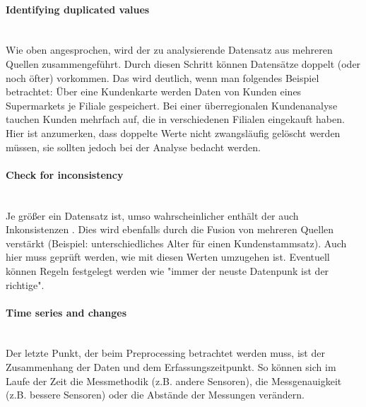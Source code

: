 \paragraph{Identifying duplicated values}\mbox{} \\
Wie oben angesprochen, wird der zu analysierende Datensatz aus mehreren Quellen zusammengeführt. Durch diesen Schritt können Datensätze doppelt (oder noch öfter) vorkommen. Das wird deutlich, wenn man folgendes Beispiel betrachtet: \newline
Über eine Kundenkarte werden Daten von Kunden eines Supermarkets je Filiale gespeichert. Bei einer überregionalen Kundenanalyse tauchen Kunden mehrfach auf, die in verschiedenen Filialen eingekauft haben. Hier ist anzumerken, dass doppelte Werte nicht zwangsläufig gelöscht werden müssen, sie sollten jedoch bei der Analyse bedacht werden.

\paragraph{Check for inconsistency}\mbox{} \\
Je größer ein Datensatz ist, umso wahrscheinlicher enthält der auch Inkonsistenzen . Dies wird ebenfalls durch die Fusion von mehreren Quellen verstärkt (Beispiel: unterschiedliches Alter für einen Kundenstammsatz). Auch hier muss geprüft werden, wie mit diesen Werten umzugehen ist. Eventuell können Regeln festgelegt werden wie "immer der neuste Datenpunk ist der richtige".

\paragraph{Time series and changes}\mbox{} \\
Der letzte Punkt, der beim Preprocessing betrachtet werden muss, ist der Zusammenhang der Daten und dem Erfassungszeitpunkt. So können sich im Laufe der Zeit die Messmethodik (z.B. andere Sensoren), die Messgenauigkeit (z.B. bessere Sensoren) oder die Abstände der Messungen verändern. 

